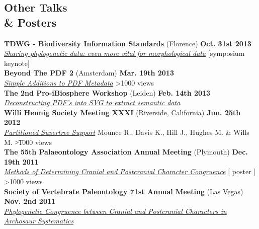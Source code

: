 \documentclass[margin,line]{resume}
\begin{document}
\begin{resume}
    \section{\mysidestyle Other Talks\\ \&  Posters}


\textbf{TDWG - Biodiversity Information Standards} (Florence) \hfill \textbf{Oct. 31st 2013}\\
  \textsl{\href{http://wiki.tdwg.org/twiki/bin/view/Phylogenetics/PhyloSharingWorkshop2013}{Sharing phylogenetic data: even more vital for morphological data}} [symposium keynote] \\

\vspace{-7 mm}
 \textbf{Beyond The PDF 2} (Amsterdam) \hfill \textbf{Mar. 19th 2013}\\
    \textsl{\href{http://www.slideshare.net/rossmounce/simple-additions-to-metadata}{Simple Additions to PDF Metadata}} \hfill {\color{red} 		\textgreater 1000 views}\\

\vspace{-7 mm}
\textbf{The 2nd Pro-iBiosphere Workshop} (Leiden) \hfill \textbf{Feb. 14th 2013}\\
    \textsl{\href{http://wiki.pro-ibiosphere.eu/wiki/Workshops_Leiden_February_2013}{Deconstructing PDF's into SVG to extract semantic data}}\\
    
\vspace{-7 mm}
\textbf{Willi Hennig Society Meeting XXXI} (Riverside, California) \hfill \textbf{Jun. 25th 2012}\\
  \textsl{\href{http://prezi.com/xvas71fzr-am/hennig-xxxi/}{Partitioned Supertree Support}} Mounce R., Davis K., Hill J., Hughes M. \& Wills M. \hfill {\color{red} \t	\textgreater1000 views}\\

\vspace{-7 mm}
    \textbf{The 55th Palaeontology Association Annual Meeting} (Plymouth) \hfill \textbf{Dec. 19th 2011}\\
    \textsl{\href{http://rossmounce.co.uk/posters/}{Methods of Determining Cranial and Postcranial Character Congruence}} [ poster ]\hfill {\color{red} \textgreater 1000 views}\\

\vspace{-7 mm}    
    \textbf{Society of Vertebrate Paleontology 71st Annual Meeting} (Las Vegas) \hfill \textbf{Nov. 2nd 2011}\\
    \textsl{\href{http://www.slideshare.net/rossmounce/phylogenetic-congruence-between-cranial-and-postcranial-characters-in-archosaur-systematics}{Phylogenetic Congruence between Cranial and Postcranial Characters in Archosaur Systematics}}\\


\end{resume}
\end{document}
